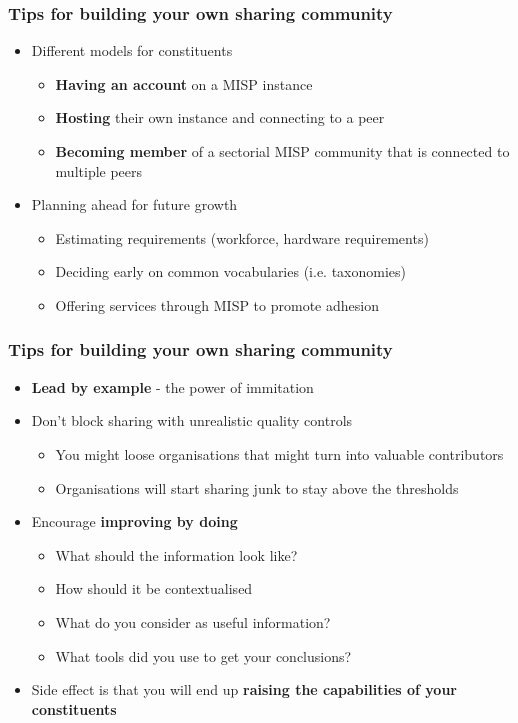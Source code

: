 \begin{frame}
    \frametitle{Tips for building your own sharing community}
    \begin{itemize}
        \item Different models for constituents
        \begin{itemize}
            \item {\bf Having an account} on a MISP instance
            \item {\bf Hosting} their own instance and connecting to a peer
            \item {\bf Becoming member} of a sectorial MISP community that is connected to multiple peers
        \end{itemize}
        \item Planning ahead for future growth
        \begin{itemize}
            \item Estimating requirements (workforce, hardware requirements)
            \item Deciding early on common vocabularies (i.e. taxonomies)
            \item Offering services through MISP to promote adhesion
        \end{itemize}
    \end{itemize}
\end{frame}

\begin{frame}
    \frametitle{Tips for building your own sharing community}
    \begin{itemize}
        \item {\bf Lead by example} - the power of immitation
        \item Don't block sharing with unrealistic quality controls
        \begin{itemize}
            \item You might loose organisations that might turn into valuable contributors
            \item Organisations will start sharing junk to stay above the thresholds
        \end{itemize}
        \item Encourage {\bf improving by doing}
        \begin{itemize}
            \item What should the information look like?
            \item How should it be contextualised
            \item What do you consider as useful information?
            \item What tools did you use to get your conclusions?
        \end{itemize}
    \item Side effect is that you will end up {\bf raising the capabilities of your constituents}
    \end{itemize}
\end{frame}


